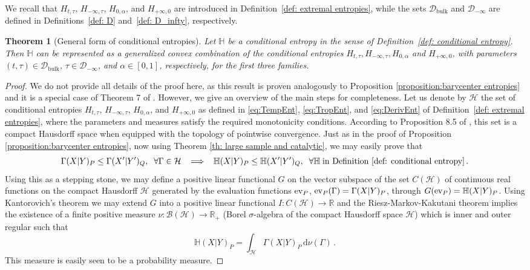\documentclass[aps,pra,11pt,onecolumn,nofootinbib,tightenlines]{revtex4-2}
\newtheorem{theorem}{Theorem}[section]
\theoremstyle{definition}
\renewcommand{\H}{\mathbb{H}}
\newcommand{\R}{\mathbb{R}}
\newcommand{\mc}[1]{\mathcal{#1}}
\newcommand{\mb}[1]{\mathbb{#1}}
\begin{document}
We recall that $H_{t,\tau}$, $H_{-\infty,\tau}$, $H_{0,\alpha}$, and $H_{+\infty,0}$ are introduced in Definition~\ref{def: extremal entropies}, while the sets $\mathcal{D}_{\mathrm{bulk}}$ and $\mathcal{D}_{-\infty}$ are defined in Definitions~\ref{def: D} and~\ref{def: D_infty}, respectively.
\begin{theorem}[General form of conditional entropies]
\label{th:barycenter conditional entropies}
Let $\H$ be a conditional entropy in the sense of Definition~\ref{def: conditional entropy}. 
Then $\H$ can be represented as a generalized convex combination of the conditional entropies $H_{t,\tau}, H_{-\infty,\tau}, H_{0,\alpha}$ and $H_{+\infty,0}$, with parameters $(t,\tau)\in\mathcal{D}_{\mathrm{bulk}}$, $\tau\in\mathcal{D}_{-\infty}$,  and $\alpha\in[0,1]$, respectively, for the first three families. 
\end{theorem}
\begin{proof}
We do not provide all details of the proof here, as this result is proven analogously to Proposition \ref{proposition:barycenter entropies} and it is a special case of Theorem 7 of \cite{haapasalo_inprep}. However, we give an overview of the main steps for completeness. Let us denote by $\mc H$ the set of conditional entropies $H_{t,\tau}$, $H_{-\infty,\tau}$, $H_{0,\alpha}$, and $H_{+\infty,0}$ as defined in \eqref{eq:TempEnt}, \eqref{eq:TropEnt}, and \eqref{eq:DerivEnt} of Definition~\ref{def: extremal entropies}, where the parameters and measures satisfy the required monotonicity conditions. According to Proposition 8.5 of \cite{fritz2023abstractII}, this set is a compact Hausdorff space when equipped with the topology of pointwise convergence. Just as in the proof of Proposition \ref{proposition:barycenter entropies}, now using Theorem \ref{th: large sample and catalytic}, we may easily prove that
\begin{equation}
\Gamma(X|Y)_P \leq \Gamma(X'|Y')_Q,
\;\; \forall \Gamma \in \mc H \;\; \implies \;\; \H(X|Y)_P \leq \H(X'|Y')_Q, \;\; \forall \H \;\text{in Definition~\ref{def: conditional entropy}} \,.
\end{equation}
Using this as a stepping stone, we may define a positive linear functional $G$ on the vector subspace of the set $C(\mc H)$ of continuous real functions on the compact Hausdorff $\mc H$ generated by the evaluation functions ${\rm ev}_{P}$, ${\rm ev}_P(\Gamma)=\Gamma(X|Y)_P$, through $G({\rm ev}_P)=\mb H(X|Y)_P$. Using Kantorovich's theorem we may extend $G$ into a positive linear functional $I:C(\mc H)\to\R$ and the Riesz-Markov-Kakutani theorem implies the existence of a finite positive measure $\nu:\mc B(\mc H)\to\R_+$ (Borel $\sigma$-algebra of the compact Hausdorff space $\mc H$) which is inner and outer regular such that
\begin{equation}
\mb H(X|Y)_P=\int_{\mc H}\Gamma(X|Y)_P\,\mathrm{d}\nu(\Gamma)\,.
\end{equation}
This measure is easily seen to be a probability measure.
\end{proof}
\end{document}
